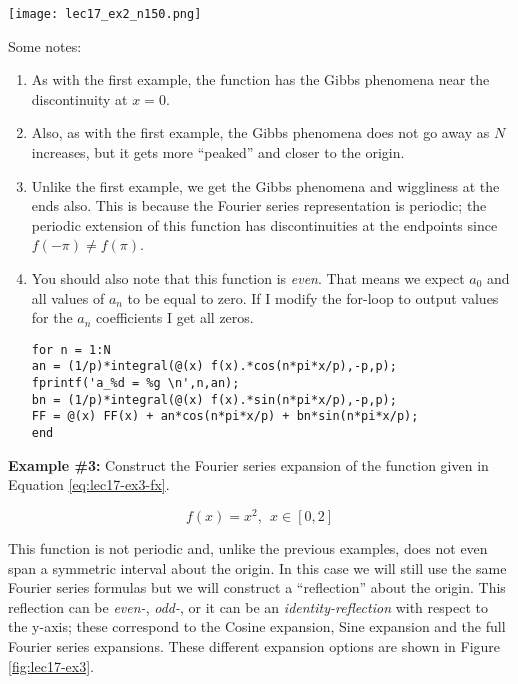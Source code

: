 \begin{marginfigure}
\texttt{[image: lec17\_ex2\_n150.png]}
\caption{Fourier series expansion with \lstinline{N=150}.}
\label{fig:lec17-ex2-n150}
\end{marginfigure}
Some notes:
\begin{enumerate}
\item As with the first example, the function has the Gibbs phenomena near the discontinuity at $x=0$.  
\item Also, as with the first example, the Gibbs phenomena does not go away as $N$ increases, but it gets more ``peaked'' and closer to the origin.
\item Unlike the first example, we get the Gibbs phenomena and wiggliness at the ends also.  This is because the Fourier series representation is periodic; the periodic extension of this function has discontinuities at the endpoints since $f(-\pi) \ne f(\pi)$.  
\item You should also note that this function is \emph{even}.  That means we expect $a_0$ and all values of $a_n$ to be equal to zero. If I modify the for-loop to output values for the $a_n$ coefficients I get all zeros.

\begin{lstlisting}
for n = 1:N
an = (1/p)*integral(@(x) f(x).*cos(n*pi*x/p),-p,p);
fprintf('a_%d = %g \n',n,an);
bn = (1/p)*integral(@(x) f(x).*sin(n*pi*x/p),-p,p);
FF = @(x) FF(x) + an*cos(n*pi*x/p) + bn*sin(n*pi*x/p); 
end
\end{lstlisting}
\end{enumerate}


\vspace{1.0cm}

\noindent\textbf{Example \#3:} Construct the Fourier series expansion of the function given in Equation \ref{eq:lec17-ex3-fx}.

\begin{equation}
f(x) = x^2, \ \ x \in[0,2]
\label{eq:lec17-ex3-fx}
\end{equation}

This function is not periodic and, unlike the previous examples, does not even span a symmetric interval about the origin.  In this case we will still use the same Fourier series formulas but we will construct a ``reflection'' about the origin.  This reflection can be \emph{even-}, \emph{odd-}, or it can be an \emph{identity-reflection} with respect to the y-axis; these correspond to the Cosine expansion, Sine expansion and the full Fourier series expansions.  These different expansion options are shown in Figure \ref{fig:lec17-ex3}.

